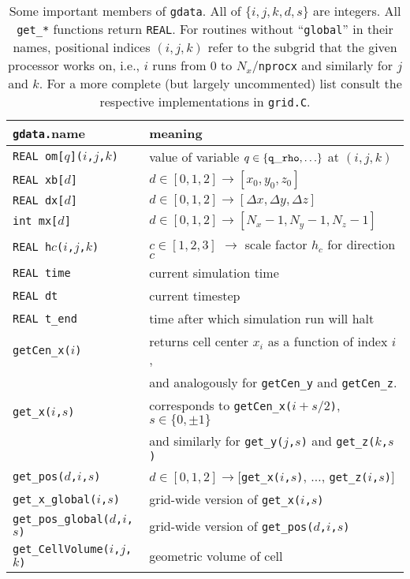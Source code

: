 \begin{table}[bh!]
  \begin{tabular}{ll}
    {\tt gdata.}name & meaning \\
    \hline
        {\tt REAL om[$q$]($i$,$j$,$k$)} &
        value of variable $q \in \{ {\tt q\_rho}, \ldots \} $
        at $(i,j,k)$ \\      
        {\tt REAL xb[$d$]} & $d \in [0, 1, 2] \rightarrow
        [x_0,y_0,z_0]$ \\
        {\tt REAL dx[$d$]} & $d \in [0, 1, 2] \rightarrow
        [\Delta x, \Delta y, \Delta z]$ \\
        {\tt int mx[$d$]} & $d \in [0, 1, 2] \rightarrow
        [N_x-1, N_y-1, N_z-1]$ \\
        {\tt REAL h$c$($i$,$j$,$k$)} & $c \in [1,2,3]$
        $\rightarrow$ scale factor $h_c$ for direction $c$\\
        {\tt REAL time} & current simulation time \\
        {\tt REAL dt} & current timestep \\
        {\tt REAL t\_end} & time after which simulation run will halt \\
        {\tt getCen\_x($i$)} & returns cell center $x_i$ as a
        function of index $i$,\\ & and analogously for
        {\tt getCen\_y} and {\tt getCen\_z}. \\
        {\tt get\_x($i$,$s$)} & corresponds to
        {\tt getCen\_x($i+s/2$)}, $s \in \{0,\pm 1\}$ \\
        & and similarly for {\tt get\_y($j$,$s$)} and {\tt get\_z($k$,$s$)} \\
        {\tt get\_pos($d$,$i$,$s$)} &  $d \in [0, 1, 2] \rightarrow
        [${\tt get\_x($i$,$s$)}, $\ldots$, {\tt get\_z($i$,$s$)}$ ]$   \\
        {\tt get\_x\_global($i$,$s$)}
        & grid-wide version of {\tt get\_x($i$,$s$)} \\
        {\tt get\_pos\_global($d$,$i$,$s$)}
        & grid-wide version of {\tt get\_pos($d$,$i$,$s$)} \\
        {\tt get\_CellVolume($i$,$j$,$k$)} & geometric volume of cell \\
       \hline
  \end{tabular}
  \caption{\label{tab:struct_gdata}
    Some important members of {\tt gdata}. All of $\{i, j, k, d, s \}$
    are integers. All {\tt get\_*} functions return {\tt REAL}.
    For routines without ``{\tt global}'' in their names, positional indices
    $(i,j,k)$ refer to the subgrid that the given processor works on, i.e.,
    $i$ runs from 0 to $N_x/${\tt nprocx} and similarly for $j$ and $k$.
    For a more complete (but largely uncommented) list consult the
    respective implementations in {\tt grid.C}.
  }
\end{table}

